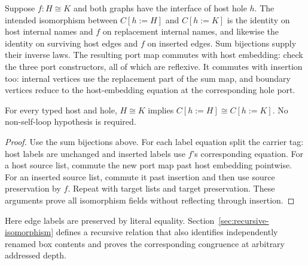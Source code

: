 Suppose $f:H\cong K$ and both graphs have the interface of host hole $h$.
The intended isomorphism between $C[h:=H]$ and $C[h:=K]$ is the identity on
host internal names and $f$ on replacement internal names, and likewise the
identity on surviving host edges and $f$ on inserted edges. Sum bijections
supply their inverse laws.
The resulting port map commutes with host embedding: check the three port
constructors, all of which are reflexive. It commutes with insertion too:
internal vertices use the replacement part of the sum map, and boundary vertices
reduce to the host-embedding equation at the corresponding hole port.
\begin{theorem}
For every typed host and hole, $H\cong K$ implies $C[h:=H]\cong C[h:=K]$.
No non-self-loop hypothesis is required.
\end{theorem}
\begin{proof}
Use the sum bijections above. For each label equation split the carrier tag:
host labels are unchanged and inserted labels use $f$'s corresponding equation.
For a host source list, commute the new port map past host embedding pointwise.
For an inserted source list, commute it past insertion and then use source
preservation by $f$. Repeat with target lists and target preservation. These
arguments prove all isomorphism fields without reflecting through insertion.
\end{proof}
Here edge labels are preserved by literal equality. Section~\ref{sec:recursive-isomorphism}
defines a recursive relation that also identifies independently renamed box
contents and proves the corresponding congruence at arbitrary addressed depth.

